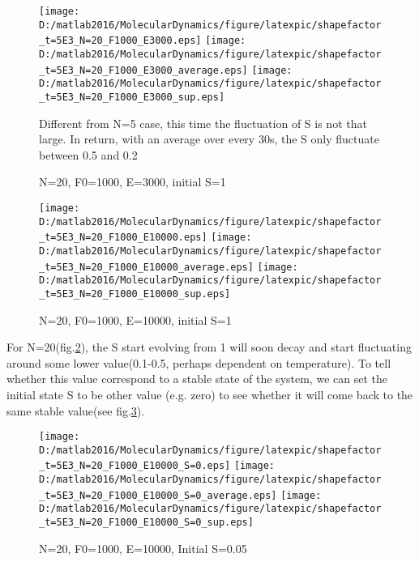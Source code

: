 \documentclass[aps,pre,twocolumn
,groupedaddress]{revtex4-1}
\begin{document}
\begin{figure}
\centering
\texttt{[image: D:/matlab2016/MolecularDynamics/figure/latexpic/shapefactor\_t=5E3\_N=20\_F1000\_E3000.eps]} 
\texttt{[image: D:/matlab2016/MolecularDynamics/figure/latexpic/shapefactor\_t=5E3\_N=20\_F1000\_E3000\_average.eps]}
\texttt{[image: D:/matlab2016/MolecularDynamics/figure/latexpic/shapefactor\_t=5E3\_N=20\_F1000\_E3000\_sup.eps]}
\caption{N=20, F0=1000, E=3000, initial S=1}
\begin{flushleft}
Different from N=5 case, this time the fluctuation of S is not that large. In return, with an average over every 30s, the S only fluctuate between 0.5 and 0.2
\end{flushleft}
\label{fig:relaxationPS2}
\end{figure}
\begin{figure}
\centering
\texttt{[image: D:/matlab2016/MolecularDynamics/figure/latexpic/shapefactor\_t=5E3\_N=20\_F1000\_E10000.eps]} 
\texttt{[image: D:/matlab2016/MolecularDynamics/figure/latexpic/shapefactor\_t=5E3\_N=20\_F1000\_E10000\_average.eps]}
\texttt{[image: D:/matlab2016/MolecularDynamics/figure/latexpic/shapefactor\_t=5E3\_N=20\_F1000\_E10000\_sup.eps]}
\caption{N=20, F0=1000, E=10000, initial S=1}
\label{fig:relaxationPS3}
\end{figure}

For N=20(fig.\ref{fig:relaxationPS3}), the S start evolving from 1 will soon decay and start fluctuating around some lower value(0.1-0.5, perhaps dependent on temperature). To tell whether this value correspond to a stable state of the system, we can set the initial state S to be other value (e.g. zero) to see whether it will come back to the same stable value(see fig.\ref{fig:relaxationPS4}).

\begin{figure}
\centering
\texttt{[image: D:/matlab2016/MolecularDynamics/figure/latexpic/shapefactor\_t=5E3\_N=20\_F1000\_E10000\_S=0.eps]} 
\texttt{[image: D:/matlab2016/MolecularDynamics/figure/latexpic/shapefactor\_t=5E3\_N=20\_F1000\_E10000\_S=0\_average.eps]}
\texttt{[image: D:/matlab2016/MolecularDynamics/figure/latexpic/shapefactor\_t=5E3\_N=20\_F1000\_E10000\_S=0\_sup.eps]}
\caption{N=20, F0=1000, E=10000, Initial S=0.05}
\label{fig:relaxationPS4}
\end{figure}
\end{document}
